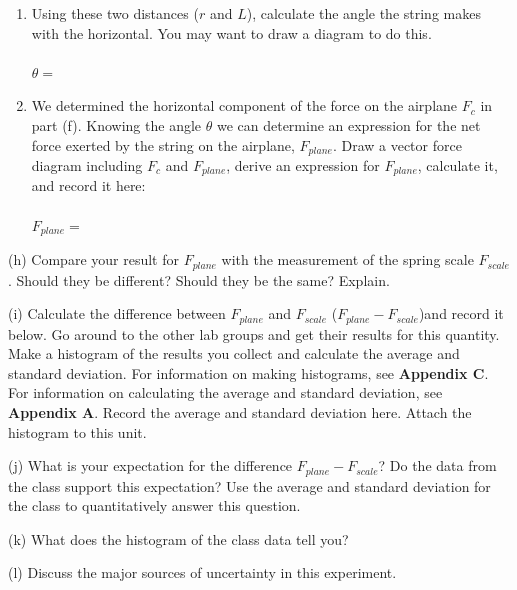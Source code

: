 \begin{enumerate}
\item Using these two distances ($r$ and $L$), 
calculate the angle the string makes with
the horizontal. You may want to draw a diagram to do this. \\
\\
\( \theta  =\)  \vspace{5mm}

\item We determined the horizontal component of the force on the airplane 
\( F_{c} \) in part (f). Knowing the angle \( \theta \) we can determine an
expression for the
net force exerted by the string on the airplane, \( F_{plane} \). Draw a vector
force diagram including \( F_{c} \) and \( F_{plane} \), derive an expression
for \( F_{plane} \), calculate it, and record it here: \\
\\
\( F_{plane} =\)  \vspace{10mm}

\end{enumerate}
(h) Compare your result for \( F_{plane} \) with the measurement of the spring
scale \( F_{scale} \). Should they be different? Should they be the same? Explain.
\vspace{15mm}


(i) Calculate the difference between \( F_{plane} \) and \( F_{scale} \) (\( F_{plane} - F_{scale} \))and record it below.
Go around to the other lab groups and get their results for this quantity.
Make a histogram of the results you collect and calculate the average and standard deviation.
For information on making histograms, see \textbf{Appendix C}. For information on calculating the average and
standard deviation, see \textbf{Appendix A}. Record the average and standard deviation here.
Attach the histogram to this unit.
\vspace{30mm}

(j) What is your expectation for the difference \( F_{plane} - F_{scale} \)?
Do the data from the class support this expectation? 
Use the average and standard deviation for the class to quantitatively answer this question.
\vspace{20mm}

(k) What does the histogram of the class data tell you?
\vspace{20mm}

(l) Discuss the major sources of uncertainty in this experiment.
\vspace{15mm}

